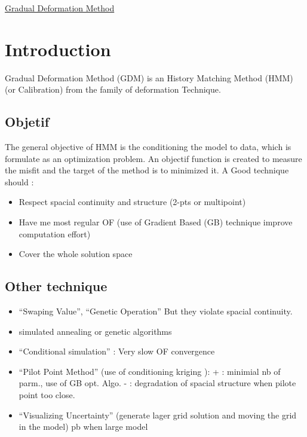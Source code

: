 \documentclass{article}
\begin{document}
\begin{multicols}{2}



\begin{center}
     \Large{\underline{Gradual Deformation Method }} \\
\end{center}

\section{Introduction}

Gradual Deformation Method (GDM) is an History Matching Method (HMM) (or Calibration) from the family of deformation Technique. 

\subsection{Objetif}
The general objective of HMM is the conditioning the model to data, which is formulate as an optimization problem. An objectif function is created to measure the misfit and  the target of the method is to minimized it. 
A Good technique should :
\begin{itemize}
\item Respect spacial continuity and structure (2-pts or multipoint)
\item Have me most regular OF (use of Gradient Based  (GB) technique improve computation effort)
\item Cover the whole solution space
\end{itemize}


\subsection{Other technique}
\begin{itemize}
\item “Swaping Value”, “Genetic Operation” \citep{deutsch1993conditioning} But they violate spacial continuity.
\item  simulated annealing or genetic algorithms 
\item “Conditional simulation” \citep{Oliver1997} : Very slow OF convergence
\item “Pilot Point Method” \citep{de1984interpretation} (use of conditioning kriging \citep{journel1978mining}): + : minimial nb of parm., use of GB opt. Algo. - : degradation of spacial structure when pilote point too close.
\item “Visualizing Uncertainty” \citep{srivastava1994interactive} (generate lager grid solution and moving the grid in the model) pb when large model
\end{itemize}


\end{multicols}
\end{document}

